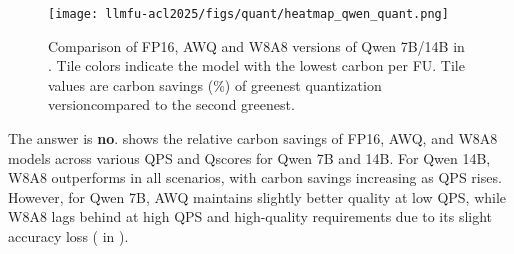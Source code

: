 
\begin{figure}[!t]
    \centering
    \texttt{[image: llmfu-acl2025/figs/quant/heatmap\_qwen\_quant.png]}
    \vspace{-0.2in}
    \caption{Comparison of FP16, AWQ and W8A8 versions of Qwen 7B/14B in \SYSTEM{}. Tile colors indicate the model with the lowest carbon per FU. Tile values are carbon savings (\%) of greenest quantization versioncompared to the second greenest.}
    \label{fig:quant_heat_w8a8_qwen}
\end{figure}

\noindent The answer is \textbf{no}.  shows the relative carbon savings of FP16, AWQ, and W8A8 models across various QPS and Qscores for Qwen 7B and 14B. For Qwen 14B, W8A8 outperforms in all scenarios, with carbon savings increasing as QPS rises. However, for Qwen 7B, AWQ maintains slightly better quality at low QPS, while W8A8 lags behind at high QPS and high-quality requirements due to its slight accuracy loss ( in ).









